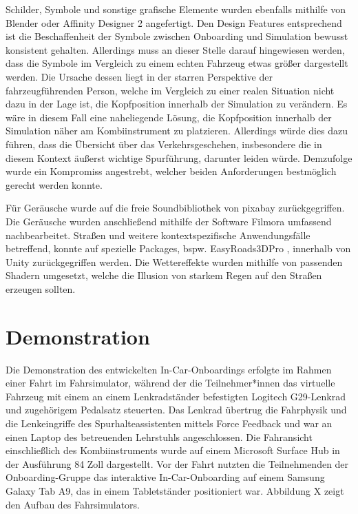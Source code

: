 Schilder, Symbole und sonstige grafische Elemente wurden ebenfalls mithilfe von Blender \cite{blender_software} oder Affinity Designer 2 \cite{serif_affinity_designer2} angefertigt. Den Design Features entsprechend ist die Beschaffenheit der Symbole zwischen Onboarding und Simulation bewusst konsistent gehalten. Allerdings muss an dieser Stelle darauf hingewiesen werden, dass die Symbole im Vergleich zu einem echten Fahrzeug etwas größer dargestellt werden. Die Ursache dessen liegt in der starren Perspektive der fahrzeugführenden Person, welche im Vergleich zu einer realen Situation nicht dazu in der Lage ist, die Kopfposition innerhalb der Simulation zu verändern. Es wäre in diesem Fall eine naheliegende Lösung, die Kopfposition innerhalb der Simulation näher am Kombiinstrument zu platzieren. Allerdings würde dies dazu führen, dass die Übersicht über das Verkehrsgeschehen, insbesondere die in diesem Kontext äußerst wichtige Spurführung, darunter leiden würde. Demzufolge wurde ein Kompromiss angestrebt, welcher beiden Anforderungen bestmöglich gerecht werden konnte. 

Für Geräusche wurde auf die freie Soundbibliothek von pixabay \cite{pixabay_soundeffekte} zurückgegriffen. Die Geräusche wurden anschließend mithilfe der Software Filmora \cite{wondershare_filmora} umfassend nachbearbeitet. Straßen und weitere kontextspezifische Anwendungsfälle betreffend, konnte auf spezielle Packages, bspw. EasyRoads3DPro \cite{andasoft_easyroads3d_pro_2026}, innerhalb von Unity zurückgegriffen werden. Die Wettereffekte wurden mithilfe von passenden Shadern umgesetzt, welche die Illusion von starkem Regen auf den Straßen erzeugen sollten.

\section{Demonstration}
\label{sec:Methodik_Phase_vier}

Die Demonstration des entwickelten In-Car-Onboardings erfolgte im Rahmen einer Fahrt im Fahrsimulator, während der die Teilnehmer*innen das virtuelle Fahrzeug mit einem an einem Lenkradständer \cite{gtplayer_gts04} befestigten Logitech G29-Lenkrad \cite{logitech_driving_force} und zugehörigem Pedalsatz steuerten. Das Lenkrad übertrug die Fahrphysik und die Lenkeingriffe des Spurhalteassistenten mittels Force Feedback und war an einen Laptop des betreuenden Lehrstuhls angeschlossen. Die Fahransicht einschließlich des Kombiinstruments wurde auf einem Microsoft Surface Hub \cite{microsoft_surface_hub_v1_84} in der Ausführung 84 Zoll dargestellt. Vor der Fahrt nutzten die Teilnehmenden der Onboarding-Gruppe das interaktive In-Car-Onboarding auf einem Samsung Galaxy Tab A9, das in einem Tabletständer positioniert war. Abbildung X zeigt den Aufbau des Fahrsimulators.

